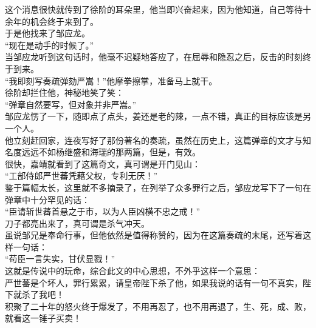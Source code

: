 \begin{multicols}{\theparacolNo}
这个消息很快就传到了徐阶的耳朵里，他当即兴奋起来，因为他知道，自己等待十余年的机会终于来到了。\\

于是他找来了邹应龙。\\

“现在是动手的时候了。”\\

当邹应龙听到这句话时，他毫不迟疑地答应了，在屈辱和隐忍之后，反击的时刻终于到来。\\

“我即刻写奏疏弹劾严嵩！”他摩拳擦掌，准备马上就干。\\

徐阶却拦住他，神秘地笑了笑：\\

“弹章自然要写，但对象并非严嵩。”\\

邹应龙愣了一下，随即点了点头，姜还是老的辣，一点不错，真正的目标应该是另一个人。\\

他立刻赶回家，连夜写好了那份著名的奏疏，虽然在历史上，这篇弹章的文才与知名度远远不如杨继盛和海瑞的那两篇，但是，有效。\\

很快，嘉靖就看到了这篇奇文，真可谓是开门见山：\\

“工部侍郎严世蕃凭藉父权，专利无厌！”\\

鉴于篇幅太长，这里就不多摘录了，在列举了众多罪行之后，邹应龙写下了一句在弹章中十分罕见的话：\\

“臣请斩世蕃首悬之于市，以为人臣凶横不忠之戒！”\\

刀子都亮出来了，真可谓是杀气冲天。\\

虽说邹兄是奉命行事，但他依然是值得称赞的，因为在这篇奏疏的末尾，还写着这样一句话：\\

“苟臣一言失实，甘伏显戮！”\\

这就是传说中的玩命，综合此文的中心思想，不外乎这样一个意思：\\

严世蕃是个坏人，罪行累累，请皇帝陛下杀了他，如果我说的话有一句不真实，陛下就杀了我吧！\\

积聚了二十年的怒火终于爆发了，不用再忍了，也不用再退了，生、死，成、败，就看这一锤子买卖！\\


\end{multicols}

